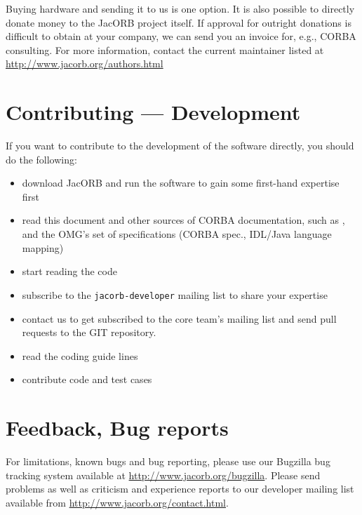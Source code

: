 Buying hardware and sending it to us is one option. It is also
possible to directly donate money to the JacORB project itself.
If approval for outright donations is difficult to obtain at your
company, we can send you an invoice for, e.g., CORBA consulting.
For more information, contact the current maintainer listed at
\href{http://www.jacorb.org/authors.html}{http://www.jacorb.org/authors.html}

\section{Contributing --- Development}

If you want to contribute to the development of the software directly,
you should do the following:

\begin{itemize}
\item download JacORB and run the software to gain some first-hand
  expertise first
\item read this document and other sources of CORBA documentation,
  such as \cite{Brose2001a}, and the OMG's set of specifications
  (CORBA spec., IDL/Java language mapping)
\item start reading the code
\item subscribe to the {\tt jacorb-developer} mailing list to share
  your expertise
\item contact us to get subscribed to the core team's mailing list and
  send pull requests to the GIT repository.
\item read the coding guide lines
\item contribute code and test cases
\end{itemize}

\section{Feedback, Bug reports}

For limitations, known bugs and bug reporting, please use our Bugzilla
bug tracking system available at
\href{http://www.jacorb.org/bugzilla}{http://www.jacorb.org/bugzilla}.
Please send problems as well as criticism and experience reports to our
developer mailing list available from
\href{http://www.jacorb.org/contact.html}{http://www.jacorb.org/contact.html}.


